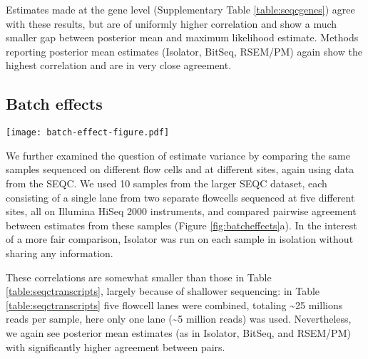 \documentclass[twocolumn]{article}
\begin{document}
Estimates made at the gene level (Supplementary Table \ref{table:seqcgenes})
agree with these results, but are of uniformly higher correlation and show a
much smaller gap between posterior mean and maximum likelihood estimate.
Methods reporting posterior mean estimates (Isolator, BitSeq, RSEM/PM) again
show the highest correlation and are in very close agreement.

\subsection{Batch effects}\label{batch-effects}

\begin{figure*}
\texttt{[image: batch-effect-figure.pdf]}
\caption{
\textbf{a} A heatmap showing pairwise proportionality correlation between
samples sequenced on two flowcells each at five sites, from centrally prepared
libraries. Flowcells are numbered arbitrarily 1 or 2 and sequencing sites are
abbreviated with three letter codes: Australian Genome Research Facility (AGR),
Beijing Genome Institute (BGI), Cornell University (CNL), Mayo Clinic (MAY), and
Novartis (NVS). Median proportionality correlation is listed below each heatmap.
\textbf{b} The absolute change in correlation induced by enabling bias
correction for methods that support it. For clarity this plot excludes points
for BitSeq estimates of "MAY 2", as bias correction has an extremely detrimental
effect on these. Mean improvement in correlation was 0.008 with Salmon, 0.007
with Cufflinks, 0.006 with Isolator, 0.003 with Kallisto, 0.002 with eXpress,
and -0.164 with BitSeq.
}

\label{fig:batcheffects}
\end{figure*}

We further examined the question of estimate variance by comparing the same
samples sequenced on different flow cells and at different sites, again using
data from the SEQC. We used 10 samples from the larger SEQC dataset, each
consisting of a single lane from two separate flowcells sequenced at five
different sites, all on Illumina HiSeq 2000 instruments, and compared pairwise
agreement between estimates from these samples (Figure \ref{fig:batcheffects}a).
In the interest of a more fair comparison, Isolator was run on each sample in
isolation without sharing any information.

These correlations are somewhat smaller than those in Table
\ref{table:seqctranscripts}, largely because of shallower sequencing: in Table
\ref{table:seqctranscripts} five flowcell lanes were combined, totaling
\textasciitilde{}25 millions reads per sample, here only one lane
(\textasciitilde{}5 million reads) was used. Nevertheless, we again see
posterior mean estimates (as in Isolator, BitSeq, and RSEM/PM) with
significantly higher agreement between pairs.
\end{document}
